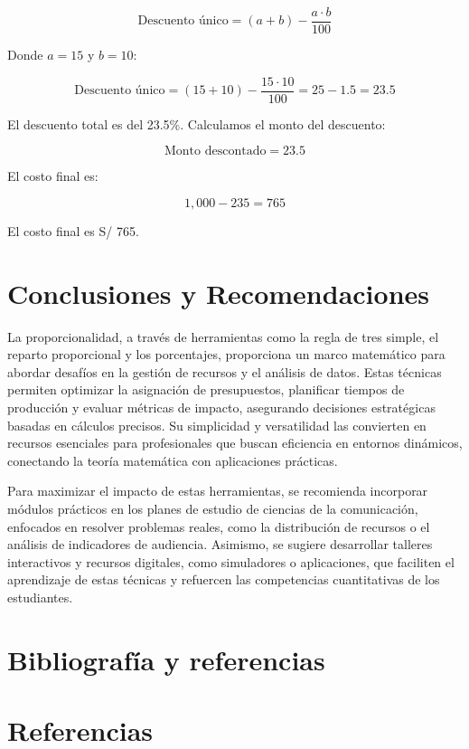 \documentclass[
  stu,
  floatsintext,
  longtable,
  a4paper,
  nolmodern,
  notxfonts,
  notimes,
  12pt,
  colorlinks=true,linkcolor=blue,citecolor=blue,urlcolor=blue]{apa7}
\begin{document}
\[
\text{Descuento único} = (a + b) - \frac{a \cdot b}{100}
\]

Donde \(a = 15%
\) y \(b = 10%
\):

\[
\text{Descuento único} = (15 + 10) - \frac{15 \cdot 10}{100} = 25 - 1.5 = 23.5
\]

El descuento total es del 23.5\%. Calculamos el monto del descuento:

\[
\text{Monto descontado} = 23.5%
\]

El costo final es:

\[
1,000 - 235 = 765
\]

El costo final es S/ 765.

\section{Conclusiones y
Recomendaciones}\label{conclusiones-y-recomendaciones}

La proporcionalidad, a través de herramientas como la regla de tres
simple, el reparto proporcional y los porcentajes, proporciona un marco
matemático para abordar desafíos en la gestión de recursos y el análisis
de datos. Estas técnicas permiten optimizar la asignación de
presupuestos, planificar tiempos de producción y evaluar métricas de
impacto, asegurando decisiones estratégicas basadas en cálculos
precisos. Su simplicidad y versatilidad las convierten en recursos
esenciales para profesionales que buscan eficiencia en entornos
dinámicos, conectando la teoría matemática con aplicaciones prácticas.

Para maximizar el impacto de estas herramientas, se recomienda
incorporar módulos prácticos en los planes de estudio de ciencias de la
comunicación, enfocados en resolver problemas reales, como la
distribución de recursos o el análisis de indicadores de audiencia.
Asimismo, se sugiere desarrollar talleres interactivos y recursos
digitales, como simuladores o aplicaciones, que faciliten el aprendizaje
de estas técnicas y refuercen las competencias cuantitativas de los
estudiantes.

\section{Bibliografía y
referencias}\label{bibliografuxeda-y-referencias}

\section{Referencias}
\end{document}
